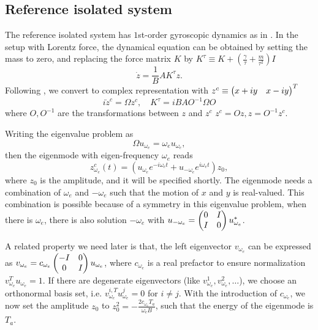 \documentclass[
 amsmath,amssymb,
 aps,
 pre,
 longbibliography,
 10pt, onecolumn,
 notitlepage
]{revtex4-1}
\begin{document}
\subsection{Reference isolated system}
The reference isolated system has $1$st-order gyroscopic dynamics as in \cite{Nash2015TopologicalMetamaterials}. In the setup with Lorentz force, the dynamical equation can be obtained by setting the mass to zero, and replacing the force matrix $K$ by $K^\tau \equiv K + (\frac{\gamma}{\tau} + \frac{m}{\tau^2})I$
\begin{equation}
    \dot{z} = \frac{1}{B} A K^\tau z.
\end{equation}
Following \cite{Nash2015TopologicalMetamaterials}, we convert to complex representation with $z^c \equiv \pmqty{x + iy & x - iy}^T$
\begin{equation}
i \dot{z}^c = \Omega z^c,\quad
K^\tau = i B A O^{-1} \Omega O
\end{equation}
where $O,O^{-1}$ are the transformations between $z$ and $z^c$ $z^c = Oz, z = O^{-1}z^c$.

Writing the eigenvalue problem as
\begin{equation}
\Omega u_{\omega_e} = \omega_e u_{\omega_e} ,
\end{equation}
then the eigenmode with eigen-frequency $\omega_e$ reads
\begin{equation} \label{eqnS:mode_zct}
z^c_{\omega_e}(t) =  (u_{\omega_e} e^{-i\omega_e t} + u_{-\omega_e} e^{i\omega_e t})z_0 ,
\end{equation}
where $z_0$ is the amplitude, and it will be specified shortly.
The eigenmode needs a combination of $\omega_e$ and $-\omega_e$ such that the motion of $x$ and $y$ is real-valued.
This combination is possible because of a symmetry in this eigenvalue problem, when there is $\omega_e$, there is also solution $-\omega_e$ with $u_{-\omega_e} = \pmqty{ 0 & I \\ I & 0 } u_{\omega_e}^*$.

A related property we need later is that, the left eigenvector $v_{\omega_e}$ can be expressed as $v_{\omega_e} = c_{\omega_e} \pmqty{ -I & 0 \\ 0 & I } u_{\omega_e}$,
where $c_{\omega_e}$ is a real prefactor to ensure normalization $v_{\omega_e}^T u_{\omega_e} = 1$.
If there are degenerate eigenvectors (like $v_{\omega_e}^{1},v_{\omega_e}^{2},\dots$), we choose an orthonormal basis set, i.e. $v_{\omega_e}^{i,T} u_{\omega_e}^{j} = 0$ for $i \neq j$.
With the introduction of $c_{\omega_e}$, we now set the amplitude $z_0$ to
$z_0^2 = -\frac{2 c_{\omega_e} T_a}{\omega_e B}$, such that the energy of the eigenmode is $T_a$.
\end{document}

